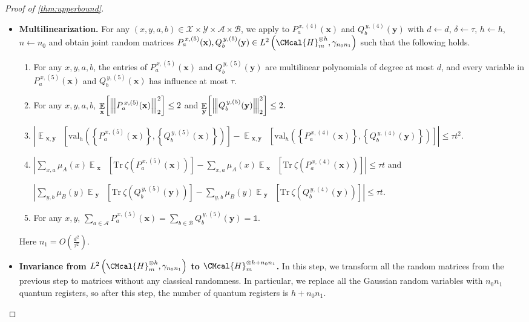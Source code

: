 \documentclass[10pt,a4paper]{article}
\def\H{\CMcal{H}}
\theoremstyle{plain}
\theoremstyle{definition}
\newcommand {\minusspace} {\: \! \!}
\newcommand {\Fn} [2] {\ensuremath{ #1 \minusspace \Br{ #2 } }}
\newcommand {\set} [1] {\ensuremath{ \left\lbrace #1 \right\rbrace }}
\newcommand {\br} [1] {\ensuremath{ \left( #1 \right) }}
\newcommand {\Br} [1] {\ensuremath{ \left[ #1 \right] }}
\newcommand {\ab} [1] {\ensuremath{ \left| #1 \right| }}
\DeclareMathOperator*{\bigE}{\mathbb{E}}
\newcommand {\expec} [2] {\Fn{\bigE_{\substack{#1}}}{#2}}
\newcommand{\nnorm}[1]{{\left\vert\kern-0.25ex\left\vert\kern-0.25ex\left\vert #1
		\right\vert\kern-0.25ex\right\vert\kern-0.25ex\right\vert}}
\newcommand {\Tr} {\ensuremath{ \mathrm{Tr} }}
\newcommand {\id} {\ensuremath{\mathds{1}}}
\newcommand{\randx}{\ensuremath{\mathbf{x}}}
\newcommand{\randy}{\ensuremath{\mathbf{y}}}
\newcommand{\herspace}[1]{\ensuremath{\H_m^{\otimes #1}}}
\newcommand{\gval}[3]{\ensuremath{\mathrm{val}_{#1}\br{\set{#2},\set{#3}}}}
\newcommand{\fourtuples}{\ensuremath{\br{x,y,a,b}\in\calX\times\calY\times\calA\times\calB}}
\newcommand{\Pnn}[1] {\ensuremath{{P^{\,x, (#1)}_a}}}
\newcommand{\Qnn}[1] {\ensuremath{{Q^{\,y, (#1)}_b}}}
\newcommand{\calX}{\mathcal{X}}
\newcommand{\calY}{\mathcal{Y}}
\newcommand{\calA}{\mathcal{A}}
\newcommand{\calB}{\mathcal{B}}
\newcommand{\1}{\mathbb{1}} %
\begin{document}
\begin{proof}[Proof of \cref{thm:upperbound}]
\begin{itemize}
\begin{enumerate}
\item For any $x,y$, $\sum_{a\in\calA}\Pnn{4}(\randx)=\sum_{b\in\calB}\Qnn{4}(\randy)=\id.$
\end{enumerate}


\item \textbf{Multilinearization.}
For any \fourtuples, we apply \cite[Lemma 13.1]{qin2021nonlocal} to $\Pnn{4}(\randx)$ and $\Qnn{4}(\randy)$ with $d\gets d$, $\delta\gets\tau$, $h\gets h$, $n\gets n_0$ and obtain joint random matrices $\Pnn{5}(\randx),\Qnn{5}(\randy)\in L^2\br{\herspace{h},\gamma_{n_0n_1}}$ such that the following holds.
\begin{enumerate}
\item For any $x,y,a,b$, the entries of $\Pnn{5}(\randx)$ and $\Qnn{5}(\randy)$ are multilinear polynomials of degree at most $d$, and every variable in $\Pnn{5}(\randx)$ and $\Qnn{5}(\randx)$ has influence at most $\tau$.
						
\item For any $x,y,a,b$, $\displaystyle\expec{\randx}{\nnorm{\Pnn{5}(\randx)}_2^2}\leq2$ and
$\displaystyle\expec{\randy}{\nnorm{\Qnn{5}(\randy)}_2^2}\leq2.$

\item $\displaystyle\ab{\expec{\randx,\randy}{\gval{h}{\Pnn{5}(\randx)}{\Qnn{5}(\randx)}}-\expec{\randx,\randy}{\gval{h}{\Pnn{4}(\randx)}{\Qnn{4}(\randy)}}}\leq\tau t^2.$

\item $\displaystyle\ab{\sum_{x,a}\mu_A(x)\expec{\randx}{\Tr~\zeta\br{\Pnn{5}(\randx)}}-\sum_{x,a}\mu_A(x)\expec{ \randx}{\Tr~\zeta\br{\Pnn{4}(\randx)}}}\leq\tau t$ \quad and

$\displaystyle\ab{\sum_{y,b}\mu_B(y)\expec{\randy}{\Tr~\zeta\br{\Qnn{5}(\randy)}}-\sum_{y,b}\mu_B(y)\expec{ \randy}{\Tr~\zeta\br{\Qnn{4}(\randy)}}}\leq\tau t.$

\item For any $x,y$, $\sum_{a\in\calA}\Pnn{5}(\randx)=\sum_{b\in\calB}\Qnn{5}(\randy)=\id.$
\end{enumerate}
Here $n_1=O\br{\frac{d^2}{\tau^2}}.$

\item \textbf{Invariance from $L^2\br{\herspace{h},\gamma_{n_0n_1}}$ to $\herspace{h+n_0n_1}$.}
In this step, we transform all the random matrices from the previous step to matrices without any classical randomness.
In particular, we replace all the Gaussian random variables with $n_0n_1$ quantum registers, so after this step, the number of quantum registers is $h + n_0n_1$.


\end{itemize}
\end{proof}
\end{document}
